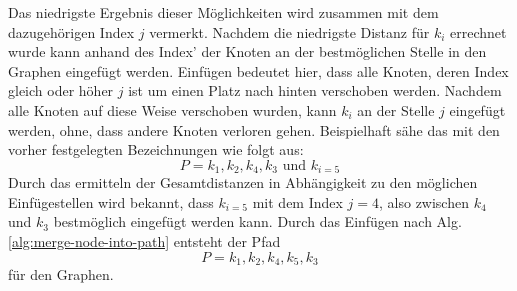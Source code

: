 Das niedrigste Ergebnis dieser Möglichkeiten wird zusammen mit dem dazugehörigen Index $j$ vermerkt. 
Nachdem die niedrigste Distanz für $k_i$ errechnet wurde kann anhand des Index' der Knoten an der bestmöglichen Stelle in den Graphen eingefügt werden. 
Einfügen bedeutet hier, dass alle Knoten, deren Index gleich oder höher $j$ ist um einen Platz nach hinten verschoben werden. 
Nachdem alle Knoten auf diese Weise verschoben wurden, kann $k_i$ an der Stelle $j$ eingefügt werden, ohne, dass andere Knoten verloren gehen. 
Beispielhaft sähe das mit den vorher festgelegten Bezeichnungen wie folgt aus: 
$$P= k_1, k_2, k_4, k_3 \textrm{ und } k_{i = 5}$$ 
Durch das ermitteln der Gesamtdistanzen in Abhängigkeit zu den möglichen Einfügestellen wird bekannt, dass $k_{i=5}$ mit dem Index $j=4$, also zwischen $k_4$ und $k_3$ bestmöglich eingefügt werden kann. 
Durch das Einfügen nach \ac{Alg.} \vref{alg:merge-node-into-path} entsteht der Pfad
$$P=k_1, k_2, k_4, k_5, k_3$$
für den Graphen.

